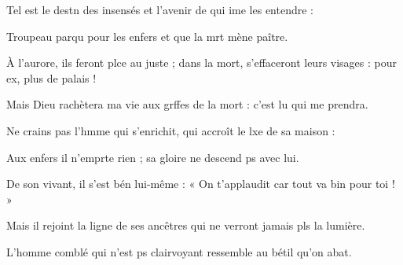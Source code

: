 \item Tel est le destn des insensés\psstar{} et l’avenir de qui ime les entendre :
\item Troupeau parqu pour les enfers\psstar{} et que la mrt mène paître. 
\item À l’aurore, ils feront plce au juste ;\psstar{} dans la mort, s’effaceront leurs visages : pour ex, plus de palais !
\item Mais Dieu rachètera ma vie aux grffes de la mort :\psstar{} c’est lu qui me prendra.
\item Ne crains pas l’hmme qui s’enrichit,\psstar{} qui accroît le lxe de sa maison :
\item Aux enfers il n’emprte rien ;\psstar{} sa gloire ne descend ps avec lui.
\item De son vivant, il s’est bén lui-même :\psstar{} « On t’applaudit car tout va bin pour toi ! »
\item Mais il rejoint la ligne de ses ancêtres\psstar{} qui ne verront jamais pls la lumière.
\item L’homme comblé qui n’est ps clairvoyant\psstar{} ressemble au bétil qu’on abat.